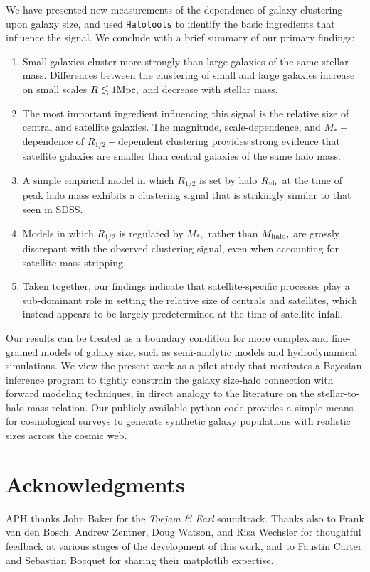 \documentclass[usenatbib,usegraphicx,letterpaper]{mn2e}
\newcommand{\ben}{\begin{enumerate}}
\newcommand{\een}{\end{enumerate}}
\newcommand{\rhalf}{R_{1/2}}
\newcommand{\mstar}{M_{\ast}}
\newcommand{\mhalo}{M_{\rm halo}}
\newcommand{\rvir}{R_{\rm vir}}
\newcommand{\mpc}{{\rm Mpc}}
\begin{document}
We have presented new measurements of the dependence of galaxy clustering upon galaxy size, and used {\tt Halotools} to identify the basic ingredients that influence the signal. We conclude with a brief summary of our primary findings:

\ben
\item Small galaxies cluster more strongly than large galaxies of the same stellar mass. Differences between the clustering of small and large galaxies increase on small scales $R\lesssim1\mpc,$ and decrease with stellar mass.
\item The most important ingredient influencing this signal is the relative size of central and satellite galaxies. The magnitude, scale-dependence, and $\mstar-$dependence of $\rhalf-$dependent clustering provides strong evidence that satellite galaxies are smaller than central galaxies of the same halo mass.
\item A simple empirical model in which $\rhalf$ is set by halo $\rvir$ at the time of peak halo mass exhibits a clustering signal that is strikingly similar to that seen in SDSS.
\item Models in which $\rhalf$ is regulated by $\mstar,$ rather than $\mhalo,$ are grossly discrepant with the observed clustering signal, even when accounting for satellite mass stripping.
\item Taken together, our findings indicate that satellite-specific processes play a sub-dominant role in setting the relative size of centrals and satellites, which instead appears to be largely predetermined at the time of satellite infall.
\een

Our results can be treated as a boundary condition for more complex and fine-grained models of galaxy size, such as semi-analytic models and hydrodynamical simulations. We view the present work as a pilot study that motivates a Bayesian inference program to tightly constrain the galaxy size-halo connection with forward modeling techniques, in direct analogy to the literature on the stellar-to-halo-mass relation. Our publicly available python code provides a simple means for cosmological surveys to generate synthetic galaxy populations with realistic sizes across the cosmic web.

\section*{Acknowledgments}

APH thanks John Baker for the {\em Toejam \& Earl} soundtrack. Thanks also to Frank van den Bosch, Andrew Zentner, Doug Watson, and Risa Wechsler for thoughtful feedback at various stages of the development of this work, and to Faustin Carter and Sebastian Bocquet for sharing their matplotlib expertise.
\end{document}
